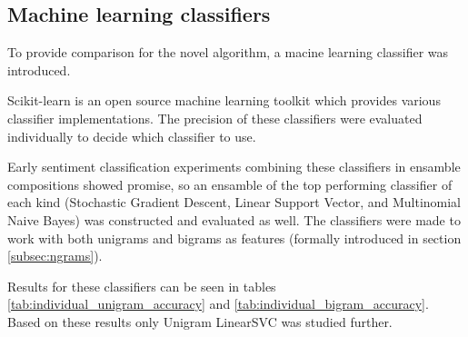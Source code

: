 \documentclass[a4paper,11pt]{kth-mag}
\begin{document}
\clearpage
\subsection{Machine learning classifiers}
To provide comparison for the novel algorithm, a macine learning classifier was introduced.

Scikit-learn\cite{scikit-learn} is an open source machine learning toolkit which provides various
classifier implementations.
The precision of these classifiers were evaluated individually to decide which classifier to use.

Early sentiment classification experiments combining these classifiers in ensamble compositions
showed promise, so an ensamble of the top performing
classifier of each kind (Stochastic Gradient Descent, Linear Support Vector, and Multinomial Naive Bayes)
was constructed and evaluated as well. The classifiers were made to work with both unigrams and bigrams
as features (formally introduced in section \ref{subsec:ngrams}).

Results for these classifiers can be seen in tables
\ref{tab:individual_unigram_accuracy} and \ref{tab:individual_bigram_accuracy}.
Based on these results only Unigram LinearSVC was studied further.
\end{document}
